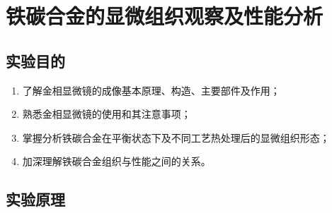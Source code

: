 \chapter{铁碳合金的显微组织观察及性能分析}
\section{实验目的}
\begin{enumerate}
    \item 了解金相显微镜的成像基本原理、构造、主要部件及作用；
    \item 熟悉金相显微镜的使用和其注意事项；
    \item 掌握分析铁碳合金在平衡状态下及不同工艺热处理后的显微组织形态；
    \item 加深理解铁碳合金组织与性能之间的关系。
\end{enumerate}

\section{实验原理}%
